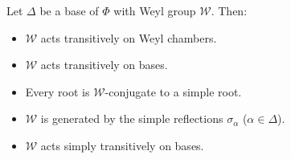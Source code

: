 Let $\Delta$ be a base of $\Phi$ with Weyl group $\mathcal{W}$. Then:
\begin{itemize}
\item[(a)] $\mathcal{W}$ acts transitively on Weyl chambers.
\item[(b)] $\mathcal{W}$ acts transitively on bases.
\item[(c)] Every root is $\mathcal{W}$-conjugate to a simple root.
\item[(d)] $\mathcal{W}$ is generated by the simple reflections $\sigma_\alpha$ ($\alpha \in \Delta$).
\item[(e)] $\mathcal{W}$ acts simply transitively on bases.
\end{itemize}

